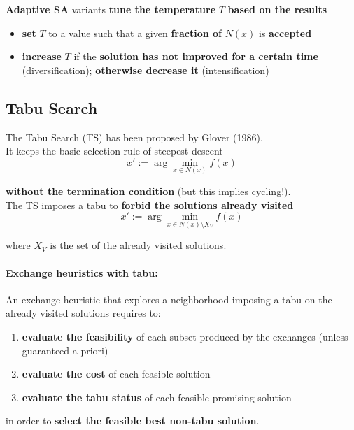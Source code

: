 \documentclass[11pt]{article}
\begin{document}
	\textbf{Adaptive SA} variants \textbf{tune the temperature} $T$ \textbf{based on the results}
	\begin{itemize}
		\item \textbf{set} $T$ to a value such that a given \textbf{fraction of} $N (x)$ is \textbf{accepted}
		
		\item \textbf{increase} $T$ if the \textbf{solution has not improved for a certain time} (diversification); \textbf{otherwise decrease it} (intensification)
	\end{itemize}
	
	\newpage
	
	\subsection{Tabu Search}
	The Tabu Search (TS) has been proposed by Glover (1986).\\
	
	It keeps the basic selection rule of steepest descent
	$$ x' := \arg \min_{x \in N(x)} f (x) $$
	
	\textbf{without the termination condition} (but this implies cycling!).\\
	
	The TS imposes a tabu to \textbf{forbid the solutions already visited}
	$$ x' := \arg \min_{x \in N(x) \setminus X_V} f(x) $$
	
	where $X_V$ is the set of the already visited solutions.\\
	
	\paragraph{Exchange heuristics with tabu:} An exchange heuristic that explores a neighborhood imposing a tabu on the already visited solutions requires to:
	\begin{enumerate}
		\item \textbf{evaluate the feasibility} of each subset produced by the exchanges (unless guaranteed a priori)
		
		\item \textbf{evaluate the cost} of each feasible solution
		
		\item \textbf{evaluate the tabu status} of each feasible promising solution
		
	\end{enumerate}
	in order to \textbf{select the feasible best non-tabu solution}.\\
	
\end{document}
